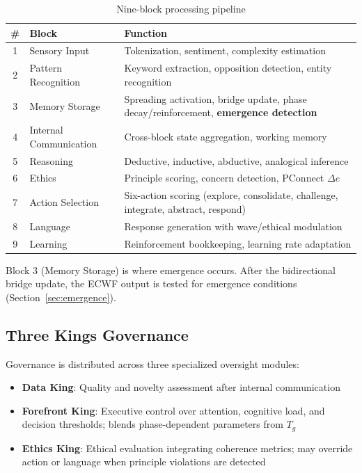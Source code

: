 \documentclass[11pt,a4paper]{article}
\begin{document}
\begin{table}[H]
\centering
\caption{Nine-block processing pipeline}
\label{tab:pipeline}
\begin{tabular}{@{}clp{7cm}@{}}
\toprule
\textbf{\#} & \textbf{Block} & \textbf{Function} \\
\midrule
1 & Sensory Input & Tokenization, sentiment, complexity estimation \\
2 & Pattern Recognition & Keyword extraction, opposition detection, entity recognition \\
3 & Memory Storage & Spreading activation, bridge update, phase decay/reinforcement, \textbf{emergence detection} \\
4 & Internal Communication & Cross-block state aggregation, working memory \\
5 & Reasoning & Deductive, inductive, abductive, analogical inference \\
6 & Ethics & Principle scoring, concern detection, PConnect $\Delta e$ \\
7 & Action Selection & Six-action scoring (explore, consolidate, challenge, integrate, abstract, respond) \\
8 & Language & Response generation with wave/ethical modulation \\
9 & Learning & Reinforcement bookkeeping, learning rate adaptation \\
\bottomrule
\end{tabular}
\end{table}

Block 3 (Memory Storage) is where emergence occurs. After the bidirectional bridge update, the ECWF output is tested for emergence conditions (Section~\ref{sec:emergence}).

\subsection{Three Kings Governance}

Governance is distributed across three specialized oversight modules:

\begin{itemize}[nosep]
    \item \textbf{Data King}: Quality and novelty assessment after internal communication
    \item \textbf{Forefront King}: Executive control over attention, cognitive load, and decision thresholds; blends phase-dependent parameters from $T_g$
    \item \textbf{Ethics King}: Ethical evaluation integrating coherence metrics; may override action or language when principle violations are detected
\end{itemize}
\end{document}
